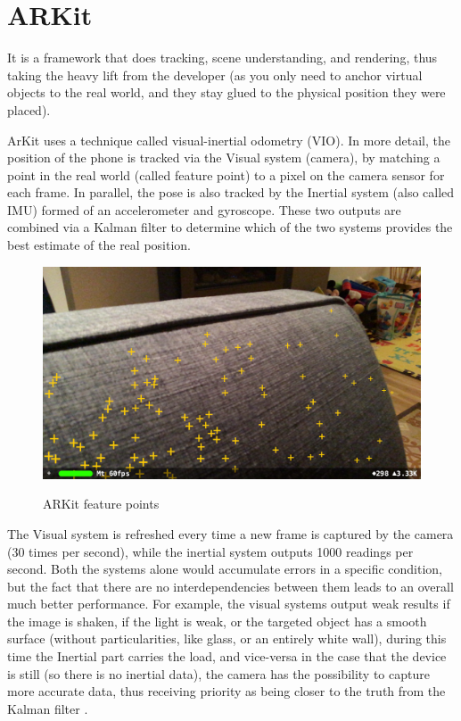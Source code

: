 \documentclass[12 pct]{report}
\begin{document}
\section{ARKit}
It is a framework that does tracking, scene understanding, and rendering, thus taking the heavy lift from the developer (as you only need to anchor virtual objects to the real world, and they stay glued to the physical position they were placed).

ArKit uses a technique called visual-inertial odometry (VIO). In more detail, the position of the phone is tracked via the Visual system (camera), by matching a point in the real world (called feature point) to a pixel on the camera sensor for each frame. In parallel, the pose is also tracked by the Inertial system  (also called IMU) formed of an accelerometer and gyroscope. These two outputs are combined via a Kalman filter to determine which of the two systems provides the best estimate of the real position.

\begin{figure}[]
\includegraphics[width=1\textwidth]{feature-points}
\centering
\label{fig:feature-points}
\caption{ARKit feature points}
\end{figure}

The Visual system is refreshed every time a new frame is captured by the camera (30 times per second), while the inertial system outputs 1000 readings per second. Both the systems alone would accumulate errors in a specific condition, but the fact that there are no interdependencies between them leads to an overall much better performance. For example, the visual systems output weak results if the image is shaken, if the light is weak, or the targeted object has a smooth surface (without particularities, like glass, or an entirely white wall), during this time the Inertial part carries the load, and vice-versa in the case that the device is still (so there is no inertial data), the camera has the possibility to capture more accurate data, thus receiving priority as being closer to the truth from the Kalman filter \cite{matt2017arkit}.
\end{document}
